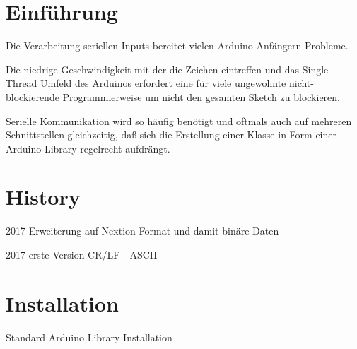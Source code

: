 \hypertarget{index_intro_sec}{}\section{Einführung}\label{index_intro_sec}
Die Verarbeitung seriellen Inputs bereitet vielen Arduino Anfängern Probleme.

Die niedrige Geschwindigkeit mit der die Zeichen eintreffen und das Single-\/\+Thread Umfeld des Arduinos erfordert eine für viele ungewohnte nicht-\/blockierende Programmierweise um nicht den gesamten Sketch zu blockieren.

Serielle Kommunikation wird so häufig benötigt und oftmals auch auf mehreren Schnittstellen gleichzeitig, daß sich die Erstellung einer Klasse in Form einer Arduino Library regelrecht aufdrängt.\hypertarget{index_hist_sec}{}\section{History}\label{index_hist_sec}

\begin{DoxyItemize}
\item 2017 Erweiterung auf Nextion Format und damit binäre Daten
\item 2017 erste Version C\+R/\+LF -\/ A\+S\+C\+II
\end{DoxyItemize}\hypertarget{index_install_sec}{}\section{Installation}\label{index_install_sec}
Standard Arduino Library Installation 